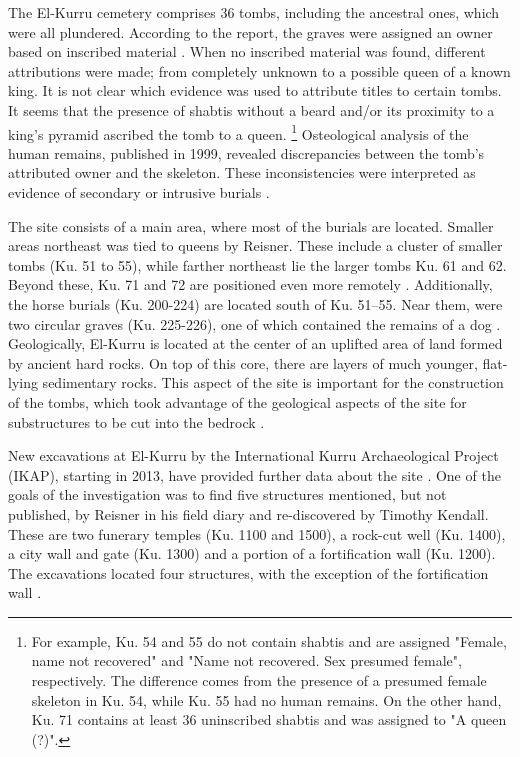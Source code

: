 The El-Kurru cemetery comprises 36 tombs, including the ancestral ones, which were all plundered. According to the report, the graves were assigned an owner based on inscribed material \parencites[p.~5-12]{dunhamElKurru1950}. When no inscribed material was found, different attributions were made; from completely unknown to a possible queen of a known king. It is not clear which evidence was used to attribute titles to certain tombs. It seems that the presence of shabtis without a beard and/or its proximity to a king's pyramid ascribed the tomb to a queen. \footnote{For example, Ku. 54 and 55 do not contain shabtis and are assigned "Female, name not recovered" and "Name not recovered. Sex presumed female", respectively. The difference comes from the presence of a presumed female skeleton in Ku. 54, while Ku. 55 had no human remains. On the other hand, Ku. 71 contains at least 36 uninscribed shabtis and was assigned to "A queen (?)".} Osteological analysis of the human remains, published in 1999, revealed discrepancies between the tomb's attributed owner and the skeleton. These inconsistencies were interpreted as evidence of secondary or intrusive burials \parencites[p.~79-80]{kendallOriginNapatanState1999, beckDemographicDataHuman1999}.


The site consists of a main area, where most of the burials are located. Smaller areas northeast was tied to queens by Reisner. These include a cluster of smaller tombs (Ku. 51 to 55), while farther northeast lie the larger tombs Ku. 61 and 62. Beyond these, Ku. 71 and 72 are positioned even more remotely \parencites{emberlingNewFindsTwentyFifth2021}. Additionally, the horse burials (Ku. 200-224) are located south of Ku. 51–55. Near them, were two circular graves (Ku. 225-226), one of which contained the remains of a dog \parencites[p.~110]{dunhamElKurru1950}. Geologically, El-Kurru is located at the center of an uplifted area of land formed by ancient hard rocks. On top of this core, there are layers of much younger, flat-lying sedimentary rocks. This aspect of the site is important for the construction of the tombs, which took advantage of the geological aspects of the site for substructures to be cut into the bedrock \parencites[p.~35-38]{stearnsGeologyHydrology2016}.


New excavations at El-Kurru by the International Kurru Archaeological Project (IKAP), starting in 2013, have provided further data about the site \parencites{emberlingNewExcavationsElKurru2013}. One of the goals of the investigation was to find five structures mentioned, but not published, by Reisner in his field diary and re-discovered by Timothy Kendall. These are two funerary temples (Ku. 1100 and 1500), a rock-cut well (Ku. 1400), a city wall and gate (Ku. 1300) and a portion of a fortification wall (Ku. 1200). The excavations located four structures, with the exception of the fortification wall \parencites[p.~47-49]{kendallOriginNapatanState1999}[p.~65-67]{ emberlingNewFindsTwentyFifth2021}.


